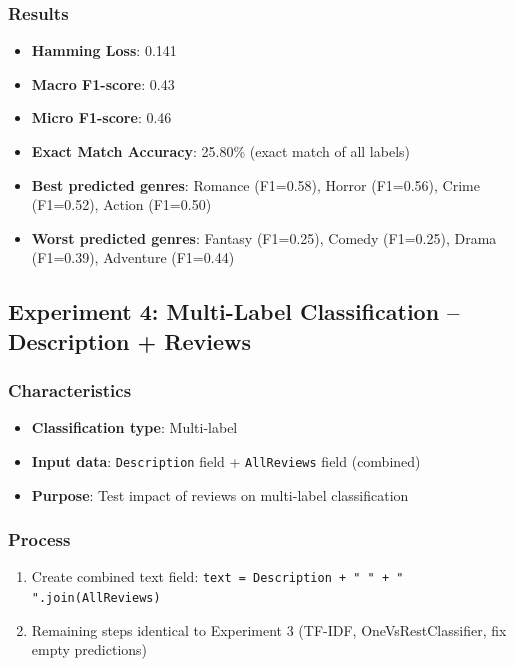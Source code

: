 \documentclass[12pt,a4paper]{article}
\begin{document}
\subsubsection{Results}
\begin{itemize}
    \item \textbf{Hamming Loss}: 0.141
    \item \textbf{Macro F1-score}: 0.43
    \item \textbf{Micro F1-score}: 0.46
    \item \textbf{Exact Match Accuracy}: 25.80\% (exact match of all labels)
    \item \textbf{Best predicted genres}: Romance (F1=0.58), Horror (F1=0.56), Crime (F1=0.52), Action (F1=0.50)
    \item \textbf{Worst predicted genres}: Fantasy (F1=0.25), Comedy (F1=0.25), Drama (F1=0.39), Adventure (F1=0.44)
\end{itemize}

\subsection{Experiment 4: Multi-Label Classification -- Description + Reviews}

\subsubsection{Characteristics}
\begin{itemize}
    \item \textbf{Classification type}: Multi-label
    \item \textbf{Input data}: \texttt{Description} field + \texttt{AllReviews} field (combined)
    \item \textbf{Purpose}: Test impact of reviews on multi-label classification
\end{itemize}

\subsubsection{Process}
\begin{enumerate}
    \item Create combined text field: \texttt{text = Description + " " + " ".join(AllReviews)}
    \item Remaining steps identical to Experiment 3 (TF-IDF, OneVsRestClassifier, fix empty predictions)
\end{enumerate}
\end{document}
